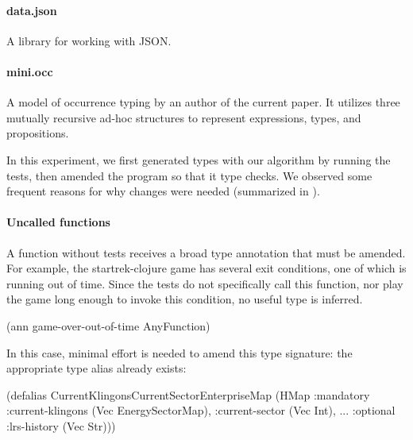 \paragraph{data.json}
A library for working with JSON.


\paragraph{mini.occ}
A model of occurrence typing by an author of the
current paper. It utilizes three mutually recursive
ad-hoc structures to represent expressions, types,
and propositions.

In this experiment, we first generated types with our algorithm
by running the tests, then amended the program so that it
type checks.
We observed some frequent reasons for why changes were needed
(summarized in ).

\paragraph{Uncalled functions}
A function without tests receives a broad type annotation that
must be amended.
%
For example, the startrek-clojure game has several exit
conditions, one of which is running out of time.
Since the tests do not specifically call this function,
nor play the game long enough to invoke this condition,
no useful type is inferred.

\begin{cljlisting}
(ann game-over-out-of-time AnyFunction)
\end{cljlisting}

In this case, minimal effort is needed to amend this
type signature: the appropriate type alias
already exists:

\begin{cljlisting}
(defalias CurrentKlingonsCurrentSectorEnterpriseMap
  (HMap :mandatory
    {:current-klingons (Vec EnergySectorMap),
     :current-sector (Vec Int), ...}
    :optional {:lrs-history (Vec Str)}))
\end{cljlisting}

